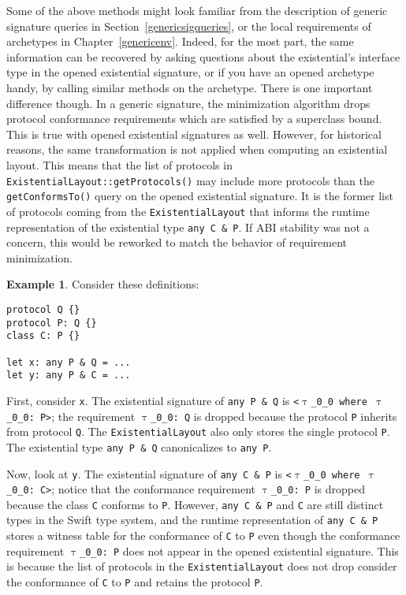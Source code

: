 \documentclass[a4paper,headsepline,bibliography=totoc,toc=flat,fleqn,twoside=semi]{scrbook}
\theoremstyle{definition}
\theoremstyle{definition}
\newtheorem{example}{Example}[chapter]
\theoremstyle{definition}
\newcommand{\ttgp}[2]{\texttt{$\uptau$\_#1\_#2}}
\begin{document}
Some of the above methods might look familiar from the description of generic signature queries in Section~\ref{genericsigqueries}, or the local requirements of archetypes in Chapter~\ref{genericenv}. Indeed, for the most part, the same information can be recovered by asking questions about the existential's interface type in the opened existential signature, or if you have an opened archetype handy, by calling similar methods on the archetype. There is one important difference though. In a generic signature, the minimization algorithm drops protocol conformance requirements which are satisfied by a superclass bound. This is true with opened existential signatures as well. However, for historical reasons, the same transformation is not applied when computing an existential layout. This means that the list of protocols in \texttt{ExistentialLayout::getProtocols()} may include more protocols than the \texttt{getConformsTo()} query on the opened existential signature. It is the former list of protocols coming from the \texttt{ExistentialLayout} that informs the runtime representation of the existential type \texttt{any C \& P}. If ABI stability was not a concern, this would be reworked to match the behavior of requirement minimization.

\begin{example}
Consider these definitions:
\begin{Verbatim}
protocol Q {}
protocol P: Q {}
class C: P {}

let x: any P & Q = ...
let y: any P & C = ...
\end{Verbatim}
First, consider \texttt{x}. The existential signature of \texttt{any P \& Q} is \texttt{<\ttgp{0}{0} where \ttgp{0}{0}:\ P>}; the requirement \texttt{\ttgp{0}{0}:\ Q} is dropped because the protocol \texttt{P} inherits from protocol \texttt{Q}. The \texttt{ExistentialLayout} also only stores the single protocol \texttt{P}. The existential type \texttt{any P \& Q} canonicalizes to \texttt{any P}.

Now, look at \texttt{y}. The existential signature of \texttt{any C \& P} is \texttt{<\ttgp{0}{0} where \ttgp{0}{0}:\ C>}; notice that the conformance requirement \texttt{\ttgp{0}{0}:\ P} is dropped because the class \texttt{C} conforms to \texttt{P}. However, \texttt{any~C~\&~P} and \texttt{C} are still distinct types in the Swift type system, and the runtime representation of \texttt{any C \& P} stores a witness table for the conformance of \texttt{C} to \texttt{P} even though the conformance requirement \texttt{\ttgp{0}{0}:\ P} does not appear in the opened existential signature. This is because the list of protocols in the \texttt{ExistentialLayout} does not drop consider the conformance of \texttt{C} to \texttt{P} and retains the protocol \texttt{P}.
\end{example}
\end{document}
